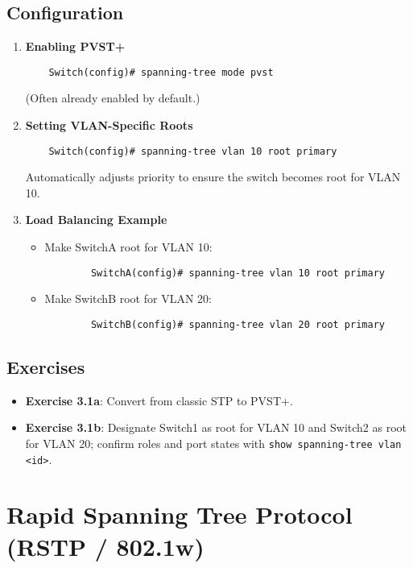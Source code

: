 \documentclass[a4paper]{report}
\begin{document}
\subsection{Configuration}
\begin{enumerate}
    \item \textbf{Enabling PVST+}
    \begin{lstlisting}
    Switch(config)# spanning-tree mode pvst
    \end{lstlisting}
    (Often already enabled by default.)
    \item \textbf{Setting VLAN-Specific Roots}
    \begin{lstlisting}
    Switch(config)# spanning-tree vlan 10 root primary
    \end{lstlisting}
    Automatically adjusts priority to ensure the switch becomes root for VLAN 10.
    \item \textbf{Load Balancing Example}
    \begin{itemize}
        \item Make SwitchA root for VLAN 10:
        \begin{lstlisting}
        SwitchA(config)# spanning-tree vlan 10 root primary
        \end{lstlisting}
        \item Make SwitchB root for VLAN 20:
        \begin{lstlisting}
        SwitchB(config)# spanning-tree vlan 20 root primary
        \end{lstlisting}
    \end{itemize}
\end{enumerate}

\subsection{Exercises}
\begin{itemize}
    \item \textbf{Exercise 3.1a}: Convert from classic STP to PVST+.
    \item \textbf{Exercise 3.1b}: Designate Switch1 as root for VLAN 10 and Switch2 as root for VLAN 20; confirm roles and port states with \texttt{show spanning-tree vlan <id>}.
\end{itemize}

\section{Rapid Spanning Tree Protocol (RSTP / 802.1w)}
\end{document}

